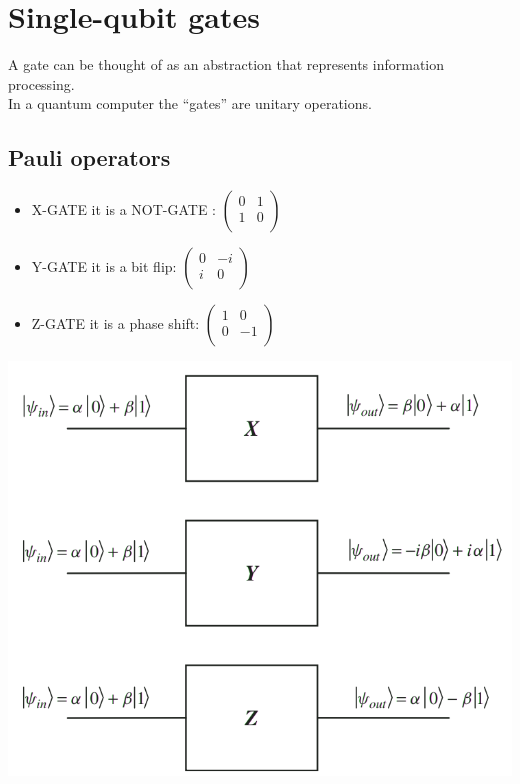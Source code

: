 \documentclass[12pt,oneside]{book}
\begin{document}
\section{Single-qubit gates}
A gate can be thought of as an abstraction that represents information processing.\\
In a quantum computer the “gates” are unitary operations.
\subsection{Pauli operators}
\begin{minipage}{0.5\linewidth}
    \begin{itemize}
        \item X-GATE it is a NOT-GATE : $ \left( \begin{matrix}
         0&1   \\ 
         1&  0 \\ 
        \end{matrix}\right)$
        \item Y-GATE it is a bit flip: $ \left( \begin{matrix}
         0&-i  \\ 
         i& 0 \\ 
        \end{matrix}\right)$
        \item Z-GATE it is a phase shift: $ \left( \begin{matrix}
         1&0  \\ 
         0&  -1 \\ 
        \end{matrix}\right)$
    \end{itemize}
\end{minipage}
\begin{minipage}{0.5\linewidth}
    \includegraphics[width=\linewidth]{../pic/3327/3}
\end{minipage}
\end{document}
